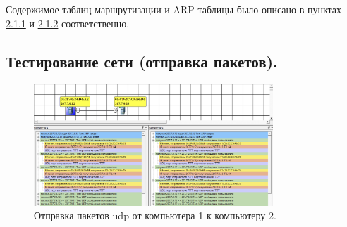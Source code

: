 \documentclass[12pt,onecolumn]{article}
\begin{document}
Содержимое таблиц маршрутизации и ARP-таблицы было описано в пунктах \hyperref[sec:routing]{2.1.1} и \hyperref[sec:arp]{2.1.2} соответственно.
\subsection{Тестирование сети (отправка пакетов).}
\begin{figure}[H]
  \centering
  \includegraphics[width=0.8\textwidth]{image/udp.png}
  \caption{Отправка пакетов udp от компьютера 1 к компьютеру 2.}
\end{figure}
\end{document}
